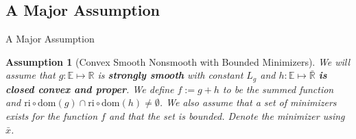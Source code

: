 \documentclass[11pt]{beamer}
\newtheorem{assumption}{Assumption}
\begin{document}
    \subsection{A Major Assumption}    
        \begin{frame}{A Major Assumption}
            \begin{assumption}[Convex Smooth Nonsmooth with Bounded Minimizers]\label{assumption:1}
                We will assume that $g:\mathbb E\mapsto \mathbb R$ is \textbf{strongly smooth} with constant $L_g$ and $h:\mathbb E \mapsto \bar{\mathbb R}$ \textbf{is closed convex and proper}. We define $f := g + h$ to be the summed function and $\text{ri}\circ \text{dom}(g) \cap \text{ri}\circ \text{dom}(h) \neq \emptyset$. We also assume that a set of minimizers exists for the function $f$ and that the set is bounded. Denote the minimizer using $\bar x$. 
            \end{assumption}
        \end{frame}
        
    
\end{document}
